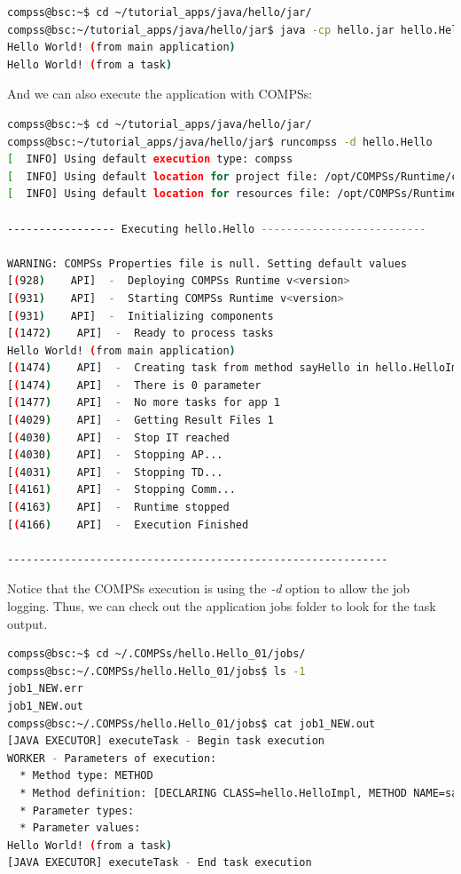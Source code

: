 \begin{lstlisting}[language=bash]
compss@bsc:~$ cd ~/tutorial_apps/java/hello/jar/
compss@bsc:~/tutorial_apps/java/hello/jar$ java -cp hello.jar hello.Hello 
Hello World! (from main application)
Hello World! (from a task)
\end{lstlisting}

And we can also execute the application with COMPSs:

\begin{lstlisting}[language=bash]
compss@bsc:~$ cd ~/tutorial_apps/java/hello/jar/
compss@bsc:~/tutorial_apps/java/hello/jar$ runcompss -d hello.Hello
[  INFO] Using default execution type: compss
[  INFO] Using default location for project file: /opt/COMPSs/Runtime/configuration/xml/projects/default_project.xml
[  INFO] Using default location for resources file: /opt/COMPSs/Runtime/configuration/xml/resources/default_resources.xml

----------------- Executing hello.Hello --------------------------

WARNING: COMPSs Properties file is null. Setting default values
[(928)    API]  -  Deploying COMPSs Runtime v<version>
[(931)    API]  -  Starting COMPSs Runtime v<version>
[(931)    API]  -  Initializing components
[(1472)    API]  -  Ready to process tasks
Hello World! (from main application)
[(1474)    API]  -  Creating task from method sayHello in hello.HelloImpl
[(1474)    API]  -  There is 0 parameter
[(1477)    API]  -  No more tasks for app 1
[(4029)    API]  -  Getting Result Files 1
[(4030)    API]  -  Stop IT reached
[(4030)    API]  -  Stopping AP...
[(4031)    API]  -  Stopping TD...
[(4161)    API]  -  Stopping Comm...
[(4163)    API]  -  Runtime stopped
[(4166)    API]  -  Execution Finished

------------------------------------------------------------
\end{lstlisting}

Notice that the COMPSs execution is using the \textit{-d} option to allow the job logging. Thus, we can check out the application jobs folder to look for
the task output.

\begin{lstlisting}[language=bash]
compss@bsc:~$ cd ~/.COMPSs/hello.Hello_01/jobs/
compss@bsc:~/.COMPSs/hello.Hello_01/jobs$ ls -1
job1_NEW.err
job1_NEW.out
compss@bsc:~/.COMPSs/hello.Hello_01/jobs$ cat job1_NEW.out
[JAVA EXECUTOR] executeTask - Begin task execution
WORKER - Parameters of execution:
  * Method type: METHOD
  * Method definition: [DECLARING CLASS=hello.HelloImpl, METHOD NAME=sayHello]
  * Parameter types:
  * Parameter values:
Hello World! (from a task)
[JAVA EXECUTOR] executeTask - End task execution
\end{lstlisting}

